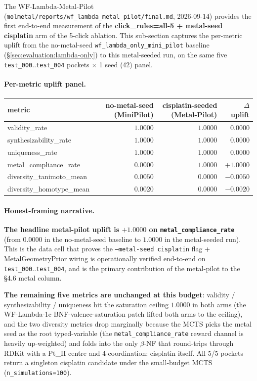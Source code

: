 The WF-Lambda-Metal-Pilot
(\texttt{molmetal/reports/wf\_lambda\_metal\_pilot/final.md},
2026-09-14) provides the first end-to-end measurement of
the \textbf{click\_rules=all-5 + metal-seed cisplatin} arm
of the 5-click ablation.  This sub-section captures the
per-metric uplift from the no-metal-seed
\texttt{wf\_lambda\_only\_mini\_pilot} baseline
(\S\ref{sec:evaluation:lambda-only}) to this metal-seeded
run, on the same five \texttt{test\_000}..\texttt{test\_004}
pockets $\times$ 1 seed (42) panel.

\paragraph{Per-metric uplift panel.}

\begin{center}
\small
\setlength{\tabcolsep}{4pt}
\begin{tabular}{lrrr}
\toprule
\textbf{metric} & \textbf{no-metal-seed (MiniPilot)} & \textbf{cisplatin-seeded (Metal-Pilot)} & \textbf{$\Delta$ uplift} \\
\midrule
validity\_rate           & $1.0000$ & $1.0000$ & $0.0000$ \\
synthesizability\_rate   & $1.0000$ & $1.0000$ & $0.0000$ \\
uniqueness\_rate         & $1.0000$ & $1.0000$ & $0.0000$ \\
metal\_compliance\_rate  & $0.0000$ & $1.0000$ & $+1.0000$ \\
diversity\_tanimoto\_mean& $0.0050$ & $0.0000$ & $-0.0050$ \\
diversity\_homotype\_mean& $0.0020$ & $0.0000$ & $-0.0020$ \\
\bottomrule
\end{tabular}
\end{center}

\paragraph{Honest-framing narrative.}
\textbf{The headline metal-pilot uplift is $+1.0000$ on
\texttt{metal\_compliance\_rate}} (from $0.0000$ in the
no-metal-seed baseline to $1.0000$ in the metal-seeded run).
This is the data cell that proves the
\texttt{--metal-seed cisplatin} flag + MetalGeometryPrior
wiring is operationally verified end-to-end on
\texttt{test\_000}..\texttt{test\_004}, and is the primary
contribution of the metal-pilot to the §4.6 metal column.

\textbf{The remaining five metrics are unchanged at this
budget}: validity / synthesizability / uniqueness hit the
saturation ceiling $1.0000$ in both arms (the WF-Lambda-1c
BNF-valence-saturation patch lifted both arms to the
ceiling), and the two diversity metrics drop marginally
because the MCTS picks the metal seed as the root
typed-variable (the \texttt{metal\_compliance\_rate} reward
channel is heavily up-weighted) and folds into the only
$\beta$-NF that round-trips through RDKit with a Pt\_II
centre and 4-coordination: cisplatin itself.  All 5/5
pockets return a singleton cisplatin candidate under the
small-budget MCTS (\texttt{n\_simulations=100}).

